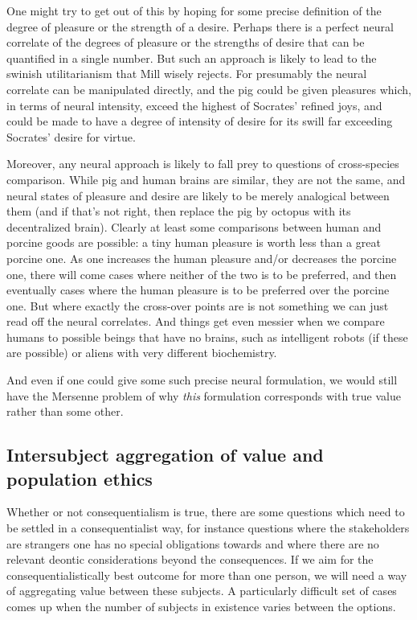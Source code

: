 One might try to get out of this by hoping for some precise definition of the degree of pleasure or the strength of a desire.
Perhaps there is a perfect neural correlate of the degrees of pleasure or the strengths of desire that can be quantified in a single
number. But such an approach is likely to lead to the swinish utilitarianism that Mill wisely rejects. For presumably the
neural correlate can be manipulated directly, and the pig could be given pleasures which, in terms of neural intensity,
exceed the highest of Socrates' refined joys, and could be made to have a degree of intensity of desire for its swill far
exceeding Socrates' desire for virtue.  

Moreover, any neural approach is likely to fall prey to questions of cross-species comparison. While pig and human brains are
similar, they are not the same, and neural states of pleasure and desire are likely to be merely analogical between them (and if
that's not right, then replace the pig by octopus with its decentralized brain). Clearly at least some
comparisons between human and porcine goods are possible: a tiny human pleasure is worth less than a great porcine one. As one
increases the human pleasure and/or decreases the porcine one, there will come cases where neither of the two is to be
preferred, and then eventually cases where the human pleasure is to be preferred over the porcine one. But where exactly
the cross-over points are is not something we can just read off the neural correlates. And things get even messier when we
compare humans to possible beings that have no brains, such as intelligent robots (if these are possible) or aliens with very 
different biochemistry.

And even if one could give some such precise neural formulation, we would still have
the Mersenne problem of why \textit{this} formulation corresponds with true value rather than some other. 

\subsection{Intersubject aggregation of value and population ethics}
Whether or not consequentialism is true, there are some questions which need to be settled in a 
consequentialist way, for instance questions where the stakeholders are strangers one has no special obligations 
towards and where there are no relevant deontic considerations beyond the consequences. If we aim for the consequentialistically best outcome for 
more than one person, we will need a way of aggregating value between these subjects. A particularly difficult set
of cases comes up when the number of subjects in existence varies between the options.

